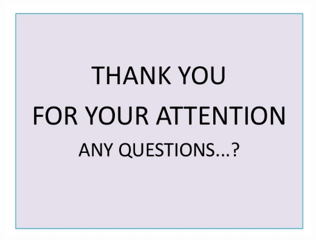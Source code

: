 \documentclass{beamer}
\begin{document}
\begin{frame}
\includegraphics[scale=.4]{tky}
\end{frame}
\end{document}
